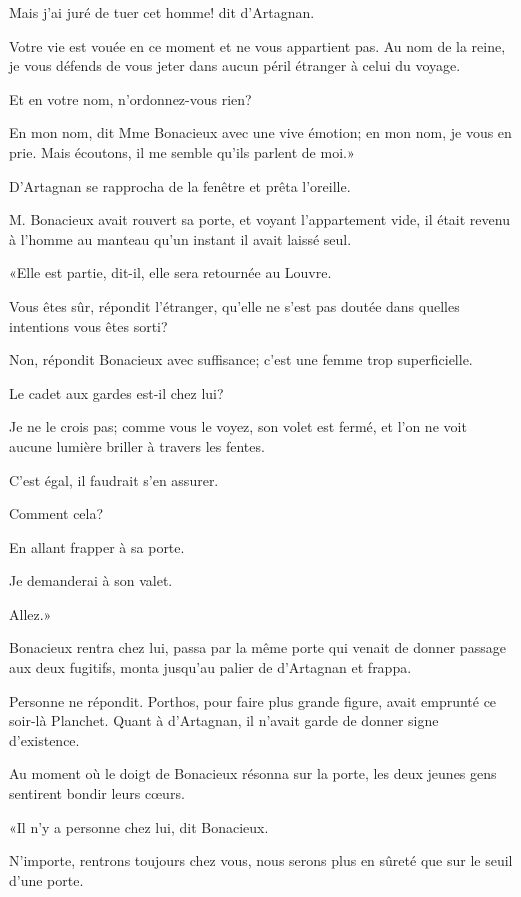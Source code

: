 \speak  Mais j'ai juré de tuer cet homme! dit d'Artagnan. 

\speak  Votre vie est vouée en ce moment et ne vous appartient pas. Au nom de la reine, je vous défends de vous jeter dans aucun péril étranger à celui du voyage. 

\speak  Et en votre nom, n'ordonnez-vous rien? 

\speak  En mon nom, dit Mme Bonacieux avec une vive émotion; en mon nom, je vous en prie. Mais écoutons, il me semble qu'ils parlent de moi.» 

D'Artagnan se rapprocha de la fenêtre et prêta l'oreille. 

M. Bonacieux avait rouvert sa porte, et voyant l'appartement vide, il était revenu à l'homme au manteau qu'un instant il avait laissé seul. 

«Elle est partie, dit-il, elle sera retournée au Louvre. 

\speak  Vous êtes sûr, répondit l'étranger, qu'elle ne s'est pas doutée dans quelles intentions vous êtes sorti? 

\speak  Non, répondit Bonacieux avec suffisance; c'est une femme trop superficielle. 

\speak  Le cadet aux gardes est-il chez lui? 

\speak  Je ne le crois pas; comme vous le voyez, son volet est fermé, et l'on ne voit aucune lumière briller à travers les fentes. 

\speak  C'est égal, il faudrait s'en assurer. 

\speak  Comment cela? 

\speak  En allant frapper à sa porte. 

\speak  Je demanderai à son valet. 

\speak  Allez.» 

Bonacieux rentra chez lui, passa par la même porte qui venait de donner passage aux deux fugitifs, monta jusqu'au palier de d'Artagnan et frappa. 

Personne ne répondit. Porthos, pour faire plus grande figure, avait emprunté ce soir-là Planchet. Quant à d'Artagnan, il n'avait garde de donner signe d'existence. 

Au moment où le doigt de Bonacieux résonna sur la porte, les deux jeunes gens sentirent bondir leurs cœurs. 

«Il n'y a personne chez lui, dit Bonacieux. 

\speak  N'importe, rentrons toujours chez vous, nous serons plus en sûreté que sur le seuil d'une porte. 

